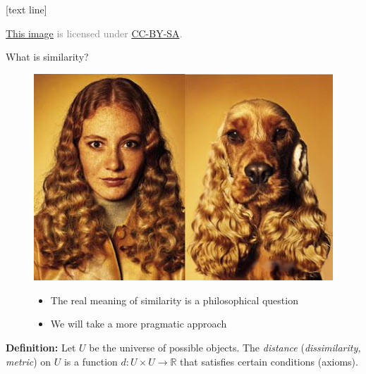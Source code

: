 \documentclass[dvipsnames]{beamer}
\newcommand{\referencefootnote}[1]{\setbeamertemplate{footline}[text line]{%
\parbox{0.9\paperwidth}{\vspace*{-23pt}\tiny{\textcolor{gray}{#1}}\hfill\scriptsize\insertframenumber}}}
\begin{document}
{ \referencefootnote{\href{https://padeprueba.fandom.com/es/wiki/Forma_animal}{\underline{This image}} is licensed under \href{https://creativecommons.org/licenses/by-sa/}{CC-BY-SA}.}
\begin{frame}{What is similarity?}
\begin{figure}[htbp]
					\begin{minipage}[t]{5.5cm}
						\vspace{0pt}
						\includegraphics[scale=.5]{figures/similarity.png}
					\end{minipage}
					\hspace{1cm} %
					\begin{minipage}[t]{4cm}
						\vspace{30pt}
						\scriptsize 
						\begin{itemize}
							\item The real meaning of similarity is a philosophical question
							\item We will take a more pragmatic approach
						\end{itemize}
					\end{minipage}
				\end{figure}
\textbf{Definition:} Let $U$ be the universe of possible objects. The \emph{distance} (\emph{dissimilarity, metric}) on $U$ is a function $d: U\times U \rightarrow \mathbb{R}$ that satisfies certain conditions (axioms). 
\end{frame}
}
		
\end{document}
